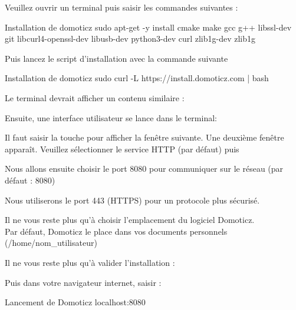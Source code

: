 {Veuillez ouvrir un terminal puis saisir les commandes suivantes : 

\begin{Bash}{Installation de domoticz}
sudo apt-get -y install cmake make gcc g++ libssl-dev git libcurl4-openssl-dev libusb-dev python3-dev curl zlib1g-dev zlib1g
\end{Bash}

Puis lancez le script d'installation avec la commande suivante

\begin{Bash}{Installation de domoticz}
  sudo curl -L https://install.domoticz.com | bash
\end{Bash}

Le terminal devrait afficher un contenu similaire : 


Ensuite, une interface utilisateur se lance dans le terminal:



Il faut saisir la touche  pour afficher la fenêtre suivante.
Une deuxième fenêtre apparaît. Veuillez sélectionner le service HTTP (par défaut) puis 


Nous allons ensuite choisir le port 8080 pour communiquer sur le réseau (par défaut : 8080)


Nous utiliserons le port 443 (HTTPS) pour un protocole plus sécurisé.


Il ne vous reste plus qu'à choisir l'emplacement du logiciel Domoticz.\\
Par défaut, Domoticz le place dans vos documents personnels (/home/nom\_utilisateur)


Il ne vous reste plus qu'à valider l'installation : 


Puis dans votre navigateur internet, saisir :

\begin{Bash}{Lancement de Domoticz}
  localhost:8080
\end{Bash}%

}
